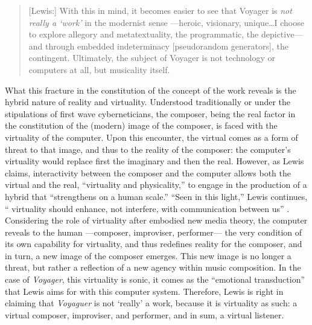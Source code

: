 \begin{quote}
	[Lewis:] With this in mind, it becomes easier to see that Voyager is \textit{not really a `work'} in the modernist sense ---heroic, visionary, unique\dots I choose to explore allegory and metatextuality, the programmatic, the depictive--- and through embedded indeterminacy [pseudorandom generators], the contingent. Ultimately, the subject of Voyager is not technology or computers at all, but musicality itself. \im \parencite[110]{Lew99:Int}
\end{quote}

What this fracture in the constitution of the concept of the work reveals is the hybrid nature of reality and virtuality. Understood traditionally or under the stipulations of first wave cyberneticians, the composer, being the real factor in the constitution of the (modern) image of the composer, is faced with the virtuality of the computer. Upon this encounter, the virtual comes as a form of threat to that image, and thus to the reality of the composer: the computer's virtuality would replace first the imaginary and then the real. However, as Lewis claims, interactivity between the composer and the computer allows both the virtual and the real, ``virtuality and physicality,'' to engage in the production of a hybrid that ``strengthens on a human scale.'' ``Seen in this light,'' Lewis continues, `` virtuality should enhance, not interfere, with communication between us'' \parencite[110]{Lew99:Int}. Considering the role of virtuality after embodied new media theory, the computer reveals to the human ---composer, improviser, performer--- the very condition of its own capability for virtuality, and thus redefines reality for the composer, and in turn, a new image of the composer emerges. This new image is no longer a threat, but rather a reflection of a new agency within music composition. In the case of \textit{Voyager}, this virtuality is sonic, it comes as the ``emotional transduction'' that Lewis aims for with this computer system. Therefore, Lewis is right in claiming that \textit{Voyaguer} is not `really' a work, because it is virtuality as such: a virtual composer, improviser, and performer, and in sum, a virtual listener.

